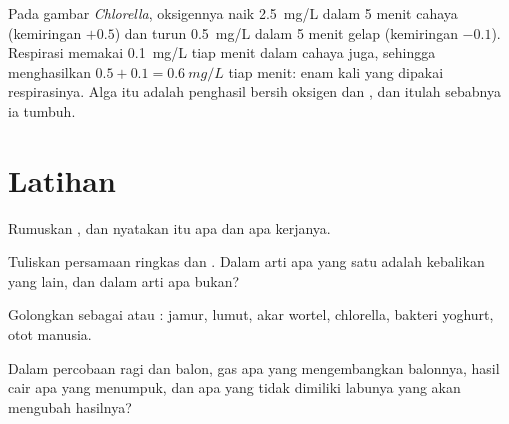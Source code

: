 \begin{example}\label{ex:g10:cell-metabolism:truerate}
Pada gambar \emph{Chlorella}, oksigennya naik \qty{2.5}{mg/L} dalam
5 menit cahaya (kemiringan $+0.5$) dan turun \qty{0.5}{mg/L} dalam 5
menit gelap (kemiringan $-0.1$). Respirasi memakai \qty{0.1}{mg/L}
tiap menit dalam cahaya juga, sehingga  menghasilkan
$0.5 + 0.1 = \qty{0.6}{mg/L}$ tiap menit: enam kali yang dipakai
respirasinya. Alga itu adalah penghasil bersih oksigen dan , dan itulah sebabnya ia tumbuh.
\end{example}

\section{Latihan}

\begin{exercise}[$\star$]\label{exo:g10:cell-metabolism:1}
Rumuskan , dan nyatakan  itu apa dan apa kerjanya.
\end{exercise}

\begin{exercise}[$\star$]\label{exo:g10:cell-metabolism:2}
Tuliskan persamaan ringkas  dan . Dalam
arti apa yang satu adalah kebalikan yang lain, dan dalam arti apa
bukan?
\end{exercise}

\begin{exercise}[$\star$]\label{exo:g10:cell-metabolism:3}
Golongkan sebagai  atau : jamur, lumut,  akar
wortel, chlorella, bakteri yoghurt,  otot manusia.
\end{exercise}

\begin{exercise}[$\star$]\label{exo:g10:cell-metabolism:4}
Dalam percobaan ragi dan balon, gas apa yang mengembangkan balonnya,
hasil cair apa yang menumpuk, dan apa yang tidak dimiliki labunya yang
akan mengubah hasilnya?
\end{exercise}

